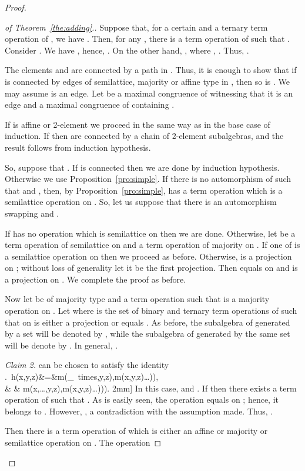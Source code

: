 \documentclass[11pt]{article}
\begin{document}
\begin{proof}
\begin{proof}[of Theorem~\ref{the:adding}.]
Suppose that, for a certain  and a ternary term
operation  of , we have
. Then, for any
, there is a term operation  of  such that
. Consider
. We have
, hence, . On the
other hand, , where ,
. Thus, .

The elements  and  are connected by a path 
in . Thus, it is enough to show that if  is
connected by edges of semilattice, majority or affine type in ,
then so is . We may assume  is an edge. Let  be a 
maximal congruence of
 witnessing that it is an edge and  a maximal
congruence of  containing . 

If  is affine or 2-element we proceed in
the same way as in the base case of induction. If
 then
 are connected by a chain of 2-element
subalgebras, and the result follows from induction hypothesis.

So, suppose that . If
 is connected then we are done by
induction hypothesis. Otherwise we use
Proposition~\ref{pro:simple}. If there is no automorphism  of 
such that  and 
, then, by Proposition~\ref{pro:simple},
 has a term operation  which is a semilattice operation on
. So, let us suppose that there is an
automorphism swapping  and .  

If  has no operation which is semilattice on
 then we are 
done. Otherwise, let  be a term operation of  semilattice on
 and  a term operation of 
majority on 
. If one of 
is a semilattice operation on  then we
proceed as before. Otherwise,  is a projection on
; without loss of
generality let it be the first projection. Then
 equals  on
 and is a projection on
. We complete the proof as before.
\medskip

Now let  be of majority type and  a term operation
such that  is a majority operation on
. Let
 where  is the set of binary and ternary term
operations  of  such that  on  is either a
projection or equals . As before, the subalgebra of
 generated by a set 
 will be denoted by , while the subalgebra of
 generated by the same set will be denote by . In
general, .
\medskip

\noindent
{\em Claim 2.}  can be chosen to satisfy the identity
.\
h(x,y,z)&=&m(_{\mbox{\footnotesize 
times}},y,z),m(x,y,z)\ldots)),\\
& & m(x,\ldots,y,z),m(x,y,z)\ldots))).
2mm]
In this case,  and . If 
 then there exists a term operation  of
 such that . As is easily seen, the
operation  equals  on
; hence, it belongs to
. However, , a contradiction with
the assumption made. Thus, . 

Then there is a term operation  of  which is either an affine 
or majority or semilattice operation on . The operation
 

\end{proof}
\end{proof}
\end{document}
